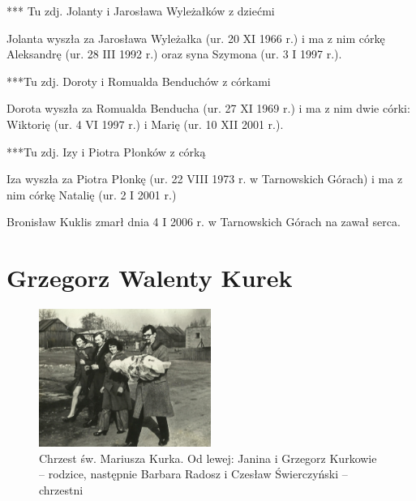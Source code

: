 {\color{red}
*** Tu zdj. Jolanty i Jarosława Wyleżałków z dziećmi}

Jolanta wyszła za Jarosława Wyleżałka (ur. 20 XI 1966 r.) i ma z nim córkę Aleksandrę (ur. 28 III 1992 r.) oraz syna Szymona (ur. 3 I 1997 r.).

{\color{red}
***Tu zdj. Doroty i Romualda Benduchów z córkami}

Dorota wyszła za Romualda Benducha (ur. 27 XI 1969 r.) i ma z nim dwie córki: Wiktorię (ur. 4 VI 1997 r.) i Marię (ur. 10 XII 2001 r.).

{\color{red}
***Tu zdj. Izy i Piotra Płonków z córką}

Iza wyszła za Piotra Płonkę (ur. 22 VIII 1973 r. w Tarnowskich Górach) i ma z nim córkę Natalię (ur. 2 I 2001 r.)

Bronisław Kuklis zmarł dnia 4 I 2006 r. w Tarnowskich Górach na zawał serca.




\section{Grzegorz Walenty Kurek}

\begin{figure}[!hb]
\begin{center}
\includegraphics[width=0.5\textwidth]{zdjecia/chrzest_mariusza_kurka.jpg}
\caption[Chrzest św. Mariusza Kurka]{Chrzest św. Mariusza Kurka. Od lewej: Janina i Grzegorz Kurkowie -- rodzice, następnie Barbara Radosz i Czesław Świerczyński -- chrzestni}
\label{rys:chrzest_mariusza_kurka}
\end{center}
\end{figure}

